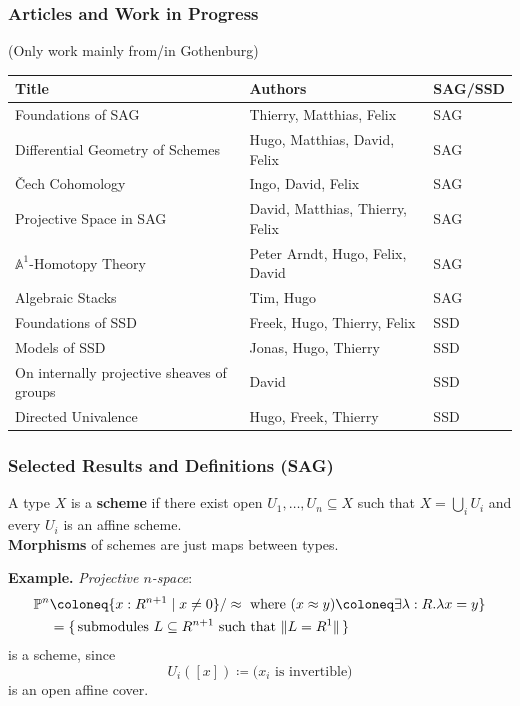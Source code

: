 \documentclass{beamer}
\begin{document}
\begin{frame}
  \frametitle{Articles and Work in Progress}
  (Only work mainly from/in Gothenburg)
  \begin{table}
    \begin{tabular}{p{3.7cm}ll}
      Title & Authors & SAG/SSD \\
      \hline
      Foundations of SAG & Thierry, Matthias, Felix & SAG \\
      Differential Geometry of Schemes & Hugo, Matthias, David, Felix & SAG \\
      \v{C}ech Cohomology & Ingo, David, Felix & SAG \\
      Projective Space in SAG & David, Matthias, Thierry, Felix & SAG \\
      $\mathbb A^1$-Homotopy Theory & Peter Arndt, Hugo, Felix, David & SAG \\
      Algebraic Stacks & Tim, Hugo & SAG \\
      Foundations of SSD & Freek, Hugo, Thierry, Felix & SSD \\
      Models of SSD & Jonas, Hugo, Thierry & SSD \\      
      On internally projective sheaves of groups & David & SSD \\
      Directed Univalence & Hugo, Freek, Thierry & SSD \\
    \end{tabular}
  \end{table}
\end{frame}

\begin{frame}
  \frametitle{Selected Results and Definitions (SAG)}
  A type $X$ is a \textbf{scheme} if
  there exist open $U_1, \dots, U_n \subseteq X$
  such that $X = \bigcup_i U_i$
  and every $U_i$ is an affine scheme. \\
  \vspace{5mm}
  \pause
  \textbf{Morphisms} of schemes are just maps between types.
  
  \pause
  \vspace{5mm}
  \textbf{Example.}
  \emph{Projective $n$-space}:
  \begin{align*}
    \bP^n
    &\coloneq \{x : R^{n+1}\mid x\neq 0\}/\approx\text{ where $(x\approx y)\coloneq \exists \lambda:R. \lambda x= y$}\} \\
    &= \{\,\text{submodules $L\subseteq R^{n+1}$ such that $\|L=R^1\|$}\,\}
  \end{align*}
  is a scheme, since
  \[
    U_i([x]) \coloneq \text{($x_i$ is invertible)}
  \]
  is an open affine cover.
\end{frame}
\end{document}
